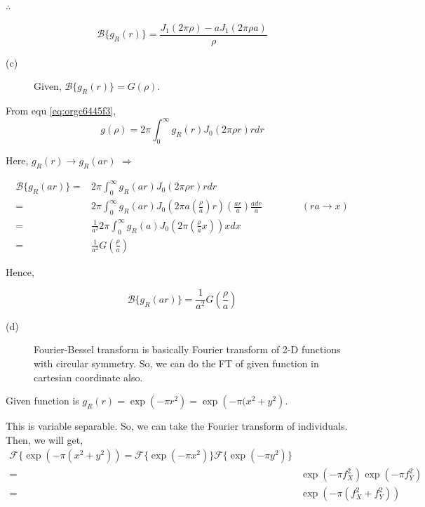 \documentclass[a4paper,11pt]{article}
\begin{document}
\(\therefore\)

$$\mathcal{B}\{g_R(r)\}=\frac{J_1(2\pi\rho)-a J_1(2\pi\rho a)}{\rho}$$

\begin{description}
\item[{(c)}] Given, \(\mathcal{B}\{g_R(r)\} = G(\rho)\).
\end{description}

From equ \ref{eq:orgc6445f3}, $$g(\rho) = 2\pi\int_0^\infty g_R(r)J_0\left(2\pi \rho r\right) rdr $$

Here, \(g_R(r)\rightarrow g_R(ar)\)
\(\Rightarrow\)

\begin{equation*}
\begin{split}
\mathcal{B}\{g_R(ar)\} = &  2\pi\int_0^\infty g_R(ar)J_0\left(2\pi \rho r\right) rdr \\ 
= &  2\pi\int_0^\infty g_R(ar)J_0\left(2\pi a \left(\frac{\rho}{a}\right) r\right) \left(\frac{ar}{a}\right)\frac{adr}{a} \qquad\qquad (ra\rightarrow x) \\ 
= &  \frac{1}{a^2}2\pi\int_0^\infty g_R(a)J_0\left(2\pi  \left(\frac{\rho}{a} x\right)\right) xdx \\
= & \frac{1}{a^2}G\left(\frac{\rho}{a}\right)
\end{split}
\end{equation*}

Hence, 

$$\mathcal{B}\{g_R(ar)\} = \frac{1}{a^2}G\left(\frac{\rho}{a}\right)$$

\begin{description}
\item[{(d)}] Fourier-Bessel transform is basically Fourier transform of 2-D functions with circular symmetry. So, we can do the FT of given function in cartesian coordinate also.
\end{description}

Given function is \(g_R(r)=\exp\left(-\pi r^2\right)=\exp\left(-\pi(x^2+y^2\right)\).

This is variable separable. So, we can take the Fourier transform of individuals. Then, we will get,
\begin{equation*}
\begin{split}
\mathcal{F}\{\exp\left(-\pi(x^2+y^2)\right) = \mathcal{F}\{\exp(-\pi x^2)\}\mathcal{F}\{\exp(-\pi y^2)\} \\
= & \exp(-\pi f_X^2)\exp(-\pi f_Y^2) \\
= & \exp\left(-\pi(f_X^2+f_Y^2)\right)
\end{split}
\end{equation*}
\end{document}
